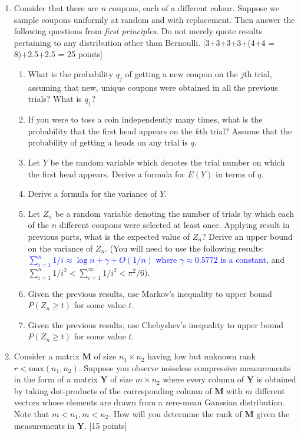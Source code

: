 \documentclass[11pt]{article}
\begin{document}
\begin{enumerate}
\item Consider that there are $n$ coupons, each of a different colour. Suppose we sample coupons uniformly at random and with replacement. Then answer the following questions from \emph{first principles}. Do not merely quote results pertaining to any distribution other than Bernoulli. \textsf{[3+3+3+3+(4+4 = 8)+2.5+2.5 = 25 points]}
\begin{enumerate}
\item What is the probability $q_j$ of getting a new coupon on the $j$th trial, assuming that new, unique coupons were obtained in all the previous trials? What is $q_1$? 
\item If you were to toss a coin independently many times, what is the probability that the first head appears on the $k$th trial? Assume that the probability of getting a heads on any trial is $q$.
\item Let $Y$ be the random variable which denotes the trial number on which the first head appears. Derive a formula for $E(Y)$ in terms of $q$. 
\item Derive a formula for the variance of $Y$.
\item Let $Z_n$ be a random variable denoting the number of trials by which each of the $n$ different coupons were selected at least once. Applying result in previous parts, what is the expected value of $Z_n$? Derive an upper bound on the variance of $Z_n$. (You will need to use the following results: \textcolor{blue}{$\sum_{i=1}^n 1/i  \approx  \log n + \gamma + O(1/n) $  where $\gamma \approx 0.5772$ is a constant}, and $\sum_{i=1}^n 1/i^2 < \sum_{i=1}^{\infty} 1/i^2 < \pi^2/6$).
\item Given the previous results, use Markov's inequality to upper bound $P(Z_n \geq t)$ for some value $t$. 
\item Given the previous results, use Chebyshev's inequality to upper bound $P(Z_n \geq t)$ for some value $t$. 
\end{enumerate}


\item Consider a matrix $\boldsymbol{M}$ of size $n_1 \times n_2$ having low but unknown rank $r < \textrm{max}(n_1,n_2)$. Suppose you observe noiseless compressive measurements in the form of a matrix $\boldsymbol{Y}$ of size $m \times n_2$ where every column of $\boldsymbol{Y}$ is obtained by taking dot-products of the corresponding column of $\boldsymbol{M}$ with $m$ different vectors whose elements are drawn from a zero-mean Gaussian distribution. Note that $m < n_1, m < n_2$. How will you determine the rank of $\boldsymbol{M}$ given the measurements in $\boldsymbol{Y}$. \textsf{[15 points]}


\end{enumerate}
\end{document}
